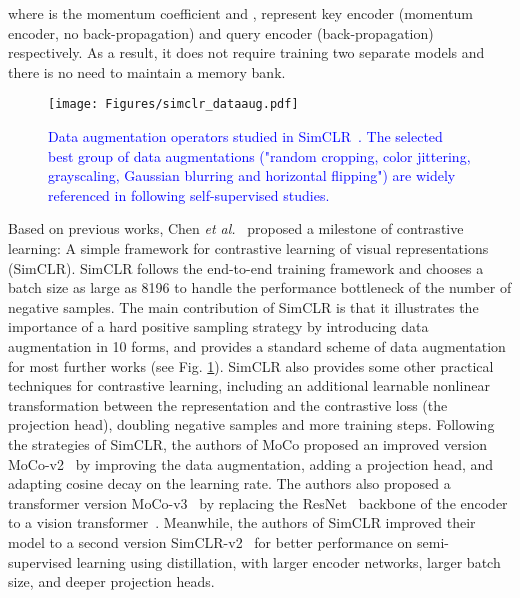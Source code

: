 \documentclass[lettersize,journal]{IEEEtran}
\newcommand{\etal}{\textit{et al.}}
\begin{document}
\noindent where  is the momentum coefficient and ,  represent key encoder (momentum encoder, no back-propagation) and query encoder (back-propagation) respectively. As a result, it does not require training two separate models and there is no need to maintain a memory bank.




\begin{figure}
\centering

\texttt{[image: Figures/simclr\_dataaug.pdf]}
\caption[dataaug]{
\textcolor{blue}{
Data augmentation operators studied in SimCLR~\cite{chen2020simple}. The selected best group of data augmentations ("random cropping, color jittering, grayscaling, Gaussian blurring and horizontal flipping") are widely referenced in following self-supervised studies.}
}
\label{fig:dataaug_simclr}
\end{figure}

Based on previous works, Chen \etal~\cite{chen2020simple} proposed a milestone of contrastive learning: A simple framework for contrastive learning of visual representations (SimCLR). SimCLR follows the end-to-end training framework and chooses a batch size as large as 8196 to handle the performance bottleneck of the number of negative samples. The main contribution of SimCLR is that it illustrates the importance of a hard positive sampling strategy by introducing data augmentation in 10 forms, and provides a standard scheme of data augmentation for most further works (see Fig. \ref{fig:dataaug_simclr}). SimCLR also provides some other practical techniques for contrastive learning, including an additional learnable nonlinear transformation between the representation and the contrastive loss (the projection head), doubling negative samples and more training steps. Following the strategies of SimCLR, the authors of MoCo proposed an improved version MoCo-v2~\cite{chen2020improved} by improving the data augmentation, adding a projection head, and adapting cosine decay on the learning rate. The authors also proposed a transformer version MoCo-v3~\cite{chen2021empirical} by replacing the ResNet~\cite{he2016deep} backbone of the encoder to a vision transformer~\cite{dosovitskiy2020image}. Meanwhile, the authors of SimCLR improved their model to a second version SimCLR-v2~\cite{chen2020big} for better performance on semi-supervised learning using distillation, with larger encoder networks, larger batch size, and deeper projection heads.
\end{document}
